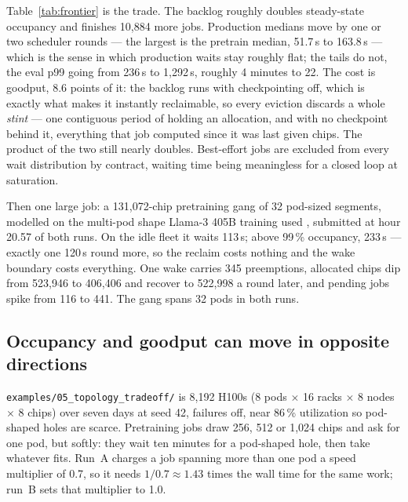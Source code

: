 Table~\ref{tab:frontier} is the trade. The backlog roughly doubles
steady-state occupancy and finishes 10,884 more jobs. Production medians move
by one or two scheduler rounds --- the largest is the pretrain median, 51.7\,s
to 163.8\,s --- which is the sense in which production waits stay roughly
flat; the tails do not, the eval p99 going from 236\,s to 1,292\,s, roughly 4
minutes to 22. The cost is goodput, 8.6 points of it: the backlog runs with
checkpointing off, which is exactly what makes it instantly reclaimable, so
every eviction discards a whole \emph{stint} --- one contiguous period of
holding an allocation, and with no checkpoint behind it, everything that job
computed since it was last given chips. The product of the two
still nearly doubles. Best-effort jobs are excluded from every wait
distribution by contract, waiting time being meaningless for a closed loop at
saturation.

Then one large job: a 131,072-chip pretraining gang of 32 pod-sized segments,
modelled on the multi-pod shape Llama-3 405B training used \cite{llama3},
submitted at hour 20.57 of both
runs. On the idle fleet it waits 113\,s; above 99\,\% occupancy, 233\,s ---
exactly one 120\,s round more, so the reclaim costs nothing and the wake
boundary costs everything. One wake carries 345 preemptions, allocated chips
dip from 523,946 to 406,406 and recover to 522,998 a round later, and pending
jobs spike from 116 to 441. The gang spans 32 pods in both runs.

\subsection{Occupancy and goodput can move in opposite
directions}\label{sec:case-tradeoff}

\texttt{examples/05\_topology\_tradeoff/} is 8,192 H100s (8 pods $\times$ 16
racks $\times$ 8 nodes $\times$ 8 chips) over seven days at seed 42, failures
off, near 86\,\% utilization so pod-shaped holes are scarce. Pretraining jobs
draw 256, 512 or 1,024 chips and ask for one pod, but softly: they wait ten
minutes for a pod-shaped hole, then take whatever fits. Run~A charges a job
spanning more than one pod a speed multiplier of 0.7, so it needs $1/0.7
\approx 1.43$ times the wall time for the same work; run~B sets that
multiplier to 1.0.

